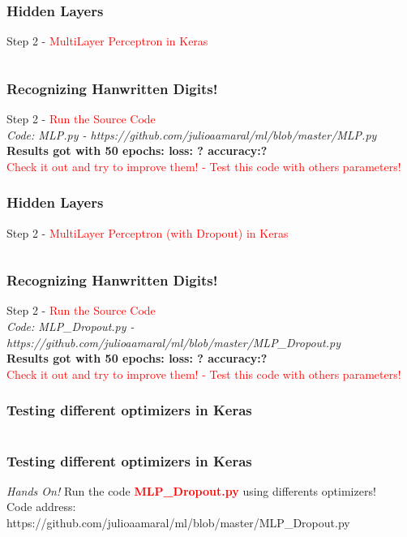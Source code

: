 \documentclass[aspectratio=169]{beamer}
\begin{document}
\begin{frame}
\frametitle{Hidden Layers}
Step 2 - \textcolor{red}{MultiLayer Perceptron in Keras}
\\[0.5cm]
\inputminted{python}{twenty.py}
\end{frame}

\begin{frame}
\frametitle{Recognizing Hanwritten Digits!}
Step 2 - \textcolor{red}{Run the Source Code}
\\[0.5cm]
\emph{Code: MLP.py - https://github.com/julioaamaral/ml/blob/master/MLP.py}
\\[0.3cm]
\textbf{Results got with 50 epochs: loss: ? accuracy:?}
\\[0.3cm]
\textcolor{red}{Check it out and try to improve them! - Test this code with others parameters!}
\end{frame}

\begin{frame}
\frametitle{Hidden Layers}
Step 2 - \textcolor{red}{MultiLayer Perceptron (with Dropout) in Keras}
\\[0.5cm]
\inputminted{python}{twentyone.py}
\end{frame}

\begin{frame}
\frametitle{Recognizing Hanwritten Digits!}
Step 2 - \textcolor{red}{Run the Source Code}
\\[0.5cm]
\emph{Code: MLP\_Dropout.py - https://github.com/julioaamaral/ml/blob/master/MLP\_Dropout.py}
\\[0.3cm]
\textbf{Results got with 50 epochs: loss: ? accuracy:?}
\\[0.3cm]
\textcolor{red}{Check it out and try to improve them! - Test this code with others parameters!}
\end{frame}



\begin{frame}
\frametitle{Testing different optimizers in Keras}
\inputminted{python}{twentytwo.py}
\end{frame}

\begin{frame}
\frametitle{Testing different optimizers in Keras}
\emph{Hands On!}
Run the code \textcolor{red}{\textbf{MLP\_Dropout.py}} using differents optimizers!
\\[0.3cm]
Code address: https://github.com/julioaamaral/ml/blob/master/MLP\_Dropout.py
\end{frame}
\end{document}
